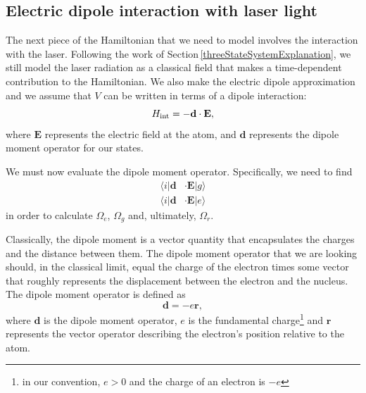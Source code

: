 \subsection{Electric dipole interaction with laser light}
\label{ElectricDipoleInteraction}
The next piece of the Hamiltonian that we need to model involves the interaction with the laser. Following the work of Section\,\ref{threeStateSystemExplanation}, we still model the laser radiation as a classical field that makes a time-dependent contribution to the Hamiltonian. We also make the electric dipole approximation and we assume that $V$ can be written in terms of a dipole interaction:  \cite{demilleBudkerKimball}\cite{cuaMITnotes}\cite{gustavsonThesis}\cite{Young1997363}
\begin{equation}
H_{\textnormal{int}}=-\mathbf{d}\cdot\mathbf{E},
\end{equation}
where $\mathbf{E}$ represents the electric field at the atom, %
and $\mathbf{d}$ represents the dipole moment operator for our states. 


We must now evaluate the dipole moment operator. Specifically, we need to find
\begin{align}
\langle i|\mathbf{d}&\cdot\mathbf{E}|g\rangle \\
\langle i|\mathbf{d}&\cdot\mathbf{E}|e\rangle
\end{align}
in order to calculate $\Omega_e$, $\Omega_g$ and, ultimately, $\Omega_r$.

Classically, the dipole moment is a vector quantity that encapsulates the charges and the distance between them. The dipole moment operator that we are looking should, in the classical limit, equal the charge of the electron times some vector that roughly represents the displacement between the electron and the nucleus. The dipole moment operator is defined as 
\begin{equation}
\mathbf{d}=-e\mathbf{r},
\end{equation}
where $\mathbf{d}$ is the dipole moment operator, $e$ is the fundamental charge\footnote{in our convention, $e>0$ and the charge of an electron is $-e$} and $\mathbf{r}$ represents the vector operator describing the electron's position relative to the atom\cite{demilleBudkerKimball}.

